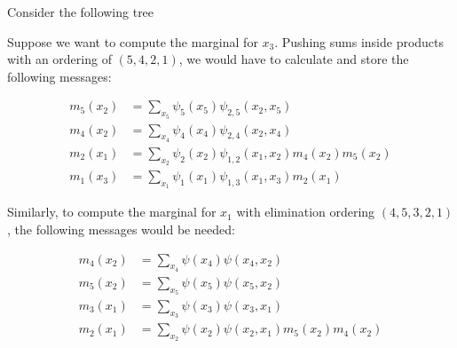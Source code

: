 \documentclass{harvardml}
\theoremstyle{definition}
\theoremstyle{plain}
\theoremstyle{definition}
\theoremstyle{remark}
\begin{document}
Consider the following tree
\begin{center}
\end{center}

Suppose we want to compute the marginal for $x_3$. Pushing sums inside products with an ordering of $(5,4,2,1)$, we would have to calculate and store the following messages:
\begin{center}
\begin{align*}
    m_5(x_2) &= \sum_{x_5} \psi_5(x_5) \psi_{2,5}(x_2, x_5)\\
    m_4(x_2) &= \sum_{x_4}\psi_4(x_4) \psi_{2,4}(x_2, x_4)\\
    m_2(x_1) &= \sum_{x_2}\psi_2(x_2) \psi_{1,2}(x_1, x_2) m_4(x_2) m_5(x_2)\\
    m_1(x_3) &= \sum_{x_1} \psi_1(x_1) \psi_{1,3}(x_1, x_3) m_2(x_1)
\end{align*}
\end{center}


Similarly, to compute the marginal for $x_1$ with  elimination ordering $(4,5,3,2,1)$, the following messages would be needed:

\begin{center}
\begin{align*}
    m_4(x_2) &= \sum_{x_4} \psi(x_4)\psi(x_4, x_2)\\
    m_5(x_2) &= \sum_{x_5} \psi(x_5)\psi(x_5, x_2)\\
    m_3(x_1) &= \sum_{x_3} \psi(x_3) \psi(x_3, x_1)\\
    m_2(x_1) &= \sum_{x_2} \psi(x_2) \psi(x_2, x_1) m_5(x_2) m_4(x_2)
\end{align*}
\end{center}
\end{document}
